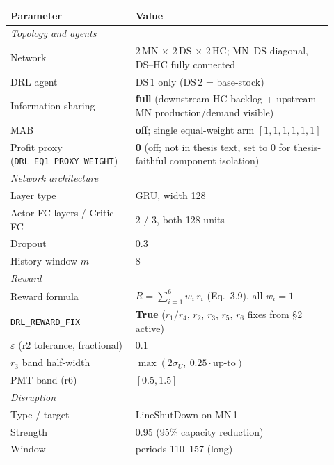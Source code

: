 \documentclass[11pt,letterpaper]{article}
\newcommand{\code}[1]{\texttt{\small #1}}
\begin{document}
\begin{table}[h!]\centering\small
\begin{tabular}{p{0.34\linewidth} p{0.58\linewidth}}
\toprule
\textbf{Parameter} & \textbf{Value} \\
\midrule
\multicolumn{2}{l}{\emph{Topology and agents}} \\
\midrule
Network                          & 2\,MN $\times$ 2\,DS $\times$ 2\,HC; MN--DS diagonal, DS--HC fully connected \\
DRL agent                        & DS\,1 only (DS\,2 = base-stock) \\
Information sharing              & \textbf{full} (downstream HC backlog + upstream MN production/demand visible) \\
MAB                              & \textbf{off}; single equal-weight arm $[1,1,1,1,1,1]$ \\
Profit proxy (\code{DRL\_EQ1\_PROXY\_WEIGHT}) & \textbf{0} (off; not in thesis text, set to 0 for thesis-faithful component isolation) \\
\midrule
\multicolumn{2}{l}{\emph{Network architecture}} \\
\midrule
Layer type                       & GRU, width 128 \\
Actor FC layers / Critic FC      & 2 / 3, both 128 units \\
Dropout                          & 0.3 \\
History window $m$               & 8 \\
\midrule
\multicolumn{2}{l}{\emph{Reward}} \\
\midrule
Reward formula                   & $R = \sum_{i=1}^{6} w_i\,r_i$ (Eq.~3.9), all $w_i=1$ \\
\code{DRL\_REWARD\_FIX}          & \textbf{True} ($r_1/r_4$, $r_2$, $r_3$, $r_5$, $r_6$ fixes from \S2 active) \\
$\varepsilon$ (r2 tolerance, fractional) & 0.1 \\
$r_3$ band half-width            & $\max(2\sigma_U,\ 0.25 \cdot \text{up-to})$ \\
PMT band (r6)                    & $[0.5, 1.5]$ \\
\midrule
\multicolumn{2}{l}{\emph{Disruption}} \\
\midrule
Type / target                    & LineShutDown on MN\,1 \\
Strength                         & 0.95 (95\% capacity reduction) \\
Window                           & periods 110--157 (long) \\

\end{tabular}
\end{table}
\end{document}
